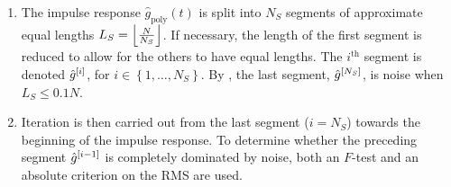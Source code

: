 \begin{enumerate}
  \item The impulse response $\hat{g}_\mathrm{poly}(t)$ is split into $N_S$ segments of approximate equal lengths
$L_S = \left\lfloor \frac{N}{N_S} \right\rfloor$. 
If necessary, the length of the first segment is reduced to allow for the others to have equal lengths.
The $i^{\text{th}}$ segment is denoted ${\hat{g}}^{[i]}$, for $i \in \left\{1,\ldots,N_S\right\}$.
  By , the last segment, ${\hat{g}}^{[N_S]}$, is noise when $L_S \leqslant 0.1N$.
  
  \item Iteration is then carried out from the last segment ($i = N_S$) towards the beginning of the impulse response. To determine whether the preceding segment ${\hat{g}}^{[i-1]}$ is completely dominated by noise,  both an $F$-test and an absolute criterion on the RMS are used.


\end{enumerate}
